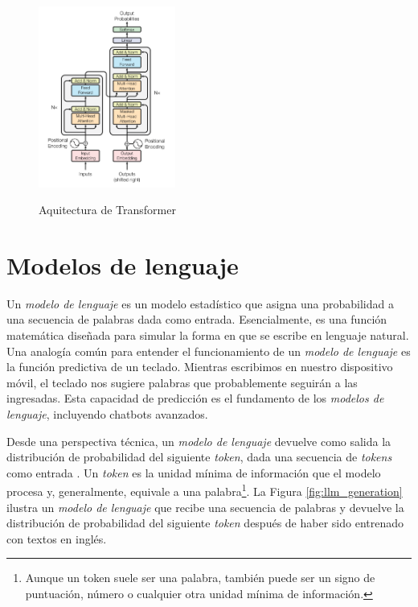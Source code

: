 \begin{figure}[h]
    \caption[Aquitectura de Transformer]{Aquitectura de Transformer}
    \centering
    \includegraphics[width=0.4\textwidth]{./figuras/Transformer_architecture.png}
    \label{fig:transformer_architecture}
\end{figure}

\section{Modelos de lenguaje}

Un \textit{modelo de lenguaje} es un modelo estadístico que asigna una probabilidad a una secuencia de palabras dada como entrada. Esencialmente, es una función matemática diseñada para simular la forma en que se escribe en lenguaje natural. Una analogía común para entender el funcionamiento de un \textit{modelo de lenguaje} es la función predictiva de un teclado. Mientras escribimos en nuestro dispositivo móvil, el teclado nos sugiere palabras que probablemente seguirán a las ingresadas. Esta capacidad de predicción es el fundamento de los \textit{modelos de lenguaje}, incluyendo chatbots avanzados.

Desde una perspectiva técnica, un \textit{modelo de lenguaje} devuelve como salida la distribución de probabilidad del siguiente \textit{token}, dada una secuencia de \textit{tokens} como entrada \citep{GenerationLLMs}. Un \textit{token} es la unidad mínima de información que el modelo procesa y, generalmente, equivale a una palabra\footnote{Aunque un token suele ser una palabra, también puede ser un signo de puntuación, número o cualquier otra unidad mínima de información.}. La Figura \ref{fig:llm_generation} ilustra un \textit{modelo de lenguaje} que recibe una secuencia de palabras y devuelve la distribución de probabilidad del siguiente \textit{token} después de haber sido entrenado con textos en inglés.

